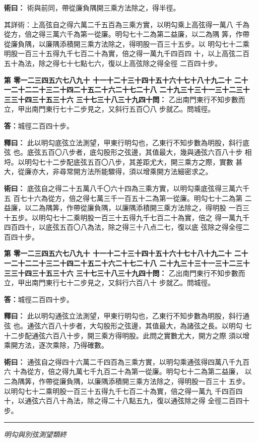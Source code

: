 \documentclass[11pt,a4paper]{article}
\newcommand{\longline}{\noindent\rule{\textwidth}{0.4pt}}
\newcounter{probnum}
\newcommand{\chnum}[1]{%
  \ifcase#1 零\or 一\or 二\or 三\or 四\or 五\or 六\or 七\or 八\or 九\or 十\or
    十一\or 十二\or 十三\or 十四\or 十五\or 十六\or 十七\or 十八\or 十九\or 二十\or
    二十一\or 二十二\or 二十三\or 二十四\or 二十五\or 二十六\or 二十七\or 二十八\or
    二十九\or 三十\or 三十一\or 三十二\or 三十三\or 三十四\or 三十五\or 三十六\or
    三十七\or 三十八\or 三十九\or 四十\fi}
\newcommand{\problem}[1]{\stepcounter{probnum}\par\noindent\textbf{第\chnum{\value{probnum}}問：}#1\par}
\newcommand{\answer}[1]{\par\noindent\textbf{答：}#1\par}
\newcommand{\shiyi}[1]{\par\noindent\textbf{釋曰：}#1\par}
\newcommand{\shuyue}[1]{\par\noindent\textbf{術曰：}#1\par}
\begin{document}
\shuyue{
術與前同，帶從廉負隅開三乘方法除之，得半徑。

其詳術：上高弦自之得六萬二千五百為三乘方實，以明勾乘上高弦得一萬八
千為從方，倍之得三萬六千為第一從廉。明勾七十二為第二益廉，以二為隅
筭，作帶從廉負隅，以廉隅添積開三乘方法除之，得明股一百三十五步。以
明勾七十二乘明股一百三十五得九千七百二十為實，倍之得一萬九千四百四
十，以上高弦二百五十為法，除之得七十七點七六，復以上高弦除之得全徑
二百四十步。
}

\vspace{0.3cm}
\problem{
乙出南門東行不知步數而立，甲出南門東行七十二步見之，又斜行五百〇八
步就乙。問城徑。
}

\answer{城徑二百四十步。}

\shiyi{
此以明勾底弦立法測望，甲東行明勾也，乙東行不知步數為明股，斜行底弦
也。底弦五百〇八步者，底勾股形之弦邊，其值最大，幾與通弦六百八十步
相埒。以明勾七十二步配底弦五百〇八步，其差距尤大，開三乘方之際，實數
甚大，從廉亦大，非尋常開方法所能驟得，須以增乘開方法細密求之。
}

\shuyue{
底弦自之得二十五萬八千〇六十四為三乘方實，以明勾乘底弦得三萬六千五
百七十六為從方，倍之得七萬三千一百五十二為第一從廉。明勾七十二為第
二益廉，以二為隅筭，作帶從廉負隅，以廉隅添積開三乘方法除之，得明股
一百三十五步。以明勾七十二乘明股一百三十五得九千七百二十為實，倍之
得一萬九千四百四十，以底弦五百〇八為法，除之得三十八点二七，復以底
弦除之得全徑二百四十步。
}

\vspace{0.3cm}
\problem{
乙出南門東行不知步數而立，甲出南門東行七十二步見之，又斜行六百八十
步就乙。問城徑。
}

\answer{城徑二百四十步。}

\shiyi{
此以明勾通弦立法測望，甲東行明勾也，乙東行不知步數為明股，斜行通弦
也。通弦六百八十步者，大勾股形之弦邊，其值最大，為諸弦之長。以明勾
七十二步配通弦六百八十步，開三乘方得明股。此問之實數尤大，開方之際
須以增乘開方法，逐次乘除，乃得確數。
}

\shuyue{
通弦自之得四十六萬二千四百為三乘方實，以明勾乘通弦得四萬八千九百六
十為從方，倍之得九萬七千九百二十為第一從廉。明勾七十二為第二益廉，
以二為隅筭，作帶從廉負隅，以廉隅添積開三乘方法除之，得明股一百三十
五步。以明勾七十二乘明股一百三十五得九千七百二十為實，倍之得一萬九
千四百四十，以通弦六百八十為法，除之得二十八點五九，復以通弦除之得
全徑二百四十步。
}

\vspace{0.5cm}
\longline
\begin{center}
\textit{明勾與別弦測望類終}
\end{center}
\end{document}
